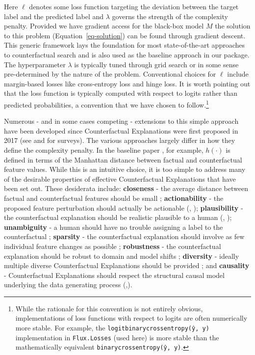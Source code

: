 \documentclass[
  letterpaper,
  DIV=11,
  numbers=noendperiod]{scrartcl}
\begin{document}
Here \(\ell\) denotes some loss function targeting the deviation between
the target label and the predicted label and \(\lambda\) governs the
strength of the complexity penalty. Provided we have gradient access for
the black-box model \(M\) the solution to this problem
(Equation~\ref{eq-solution}) can be found through gradient descent. This
generic framework lays the foundation for most state-of-the-art
approaches to counterfactual search and is also used as the baseline
approach in our package. The hyperparameter \(\lambda\) is typically
tuned through grid search or in some sense pre-determined by the nature
of the problem. Conventional choices for \(\ell\) include margin-based
losses like cross-entropy loss and hinge loss. It is worth pointing out
that the loss function is typically computed with respect to logits
rather than predicted probabilities, a convention that we have chosen to
follow.\footnote{While the rationale for this convention is not entirely
  obvious, implementations of loss functions with respect to logits are
  often numerically more stable. For example, the
  \texttt{logitbinarycrossentropy(ŷ,\ y)} implementation in
  \texttt{Flux.Losses} (used here) is more stable than the
  mathematically equivalent \texttt{binarycrossentropy(ŷ,\ y)}.}

Numerous - and in some cases competing - extensions to this simple
approach have been developed since Counterfactual Explanations were
first proposed in 2017 (see \cite{verma2020counterfactual} and
\cite{karimi2020survey} for surveys). The various approaches largely
differ in how they define the complexity penalty. In the baseline paper
\cite{wachter2017counterfactual}, for example, \(h(\cdot)\) is defined
in terms of the Manhattan distance between factual and counterfactual
feature values. While this is an intuitive choice, it is too simple to
address many of the desirable properties of effective Counterfactual
Explanations that have been set out. These desiderata include:
\textbf{closeness} - the average distance between factual and
counterfactual features should be small
\cite{wachter2017counterfactual}; \textbf{actionability} - the proposed
feature perturbation should actually be actionable
(\cite{ustun2019actionable}, \cite{poyiadzi2020face});
\textbf{plausibility} - the counterfactual explanation should be
realistic plausible to a human (\cite{joshi2019realistic},
\cite{schut2021generating}); \textbf{unambiguity} - a human should have
no trouble assigning a label to the counterfactual
\cite{schut2021generating}; \textbf{sparsity} - the counterfactual
explanation should involve as few individual feature changes as possible
\cite{schut2021generating}; \textbf{robustness} - the counterfactual
explanation should be robust to domain and model shifts
\cite{upadhyay2021robust}; \textbf{diversity} - ideally multiple diverse
Counterfactual Explanations should be provided
\cite{mothilal2020explaining}; and \textbf{causality} - Counterfactual
Explanations should respect the structural causal model underlying the
data generating process
(\cite{karimi2020algorithmic},\cite{karimi2021algorithmic}).
\end{document}
